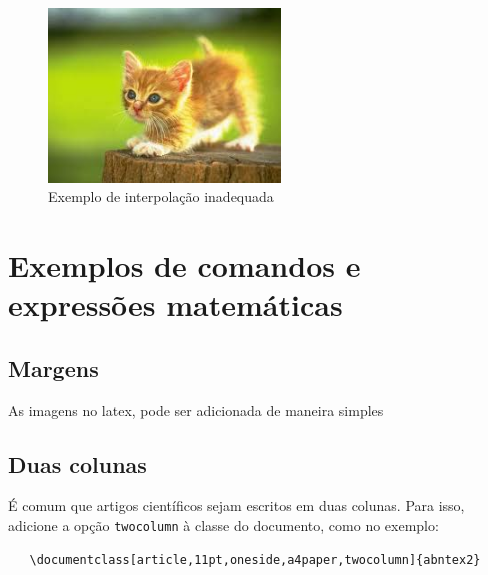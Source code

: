 \documentclass[
	article,			%
	11pt,				%
	oneside,			%
	a4paper,			%
	english,			%
	brazil,				%
	sumario=tradicional
	]{abntex2}
\begin{document}
\begin{figure} [hbt] 
\centering
\label{Rotulo}
\label{figura2} 
\caption{Exemplo de interpolação inadequada}
\includegraphics[width=0.55\textwidth]{gato.jpg}
\end{figure}

\newpage

















\newpage
\section{Exemplos de comandos e expressões matemáticas}

\subsection{Margens}

As imagens no latex, pode ser adicionada de maneira simples

\subsection{Duas colunas}

É comum que artigos científicos sejam escritos em duas colunas. Para isso,
adicione a opção \texttt{twocolumn} à classe do documento, como no exemplo:

\begin{verbatim}
   \documentclass[article,11pt,oneside,a4paper,twocolumn]{abntex2}
\end{verbatim}
\end{document}
